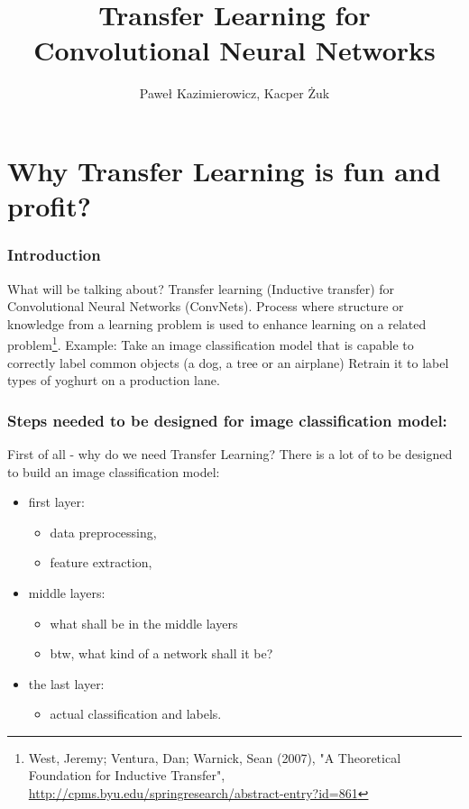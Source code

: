 \documentclass[aspectratio=1610,english]{beamer} %
\title{Transfer Learning for Convolutional Neural Networks}
\author{Paweł Kazimierowicz, Kacper Żuk}
\date{}
\institute[AGH]{

}
\begin{document}
  	\maketitle
	\part{Why Transfer Learning is fun and profit?}
	\section{Introduction}
		\begin{frame}{What will be talking about?}
			Transfer learning (Inductive transfer) for Convolutional Neural Networks (ConvNets). 
			\newline
			\newline
			Process where structure or knowledge from a learning problem is used to enhance learning on a related problem\footnote{West, Jeremy; Ventura, Dan; Warnick, Sean (2007), "A Theoretical Foundation for Inductive Transfer", \url{http://cpms.byu.edu/springresearch/abstract-entry?id=861}}. 
			\newline
			\newline
			Example: \newline
			Take an image classification model that is capable to correctly label common objects (a dog, a tree or an airplane)
			\newline 
			Retrain it to label types of yoghurt on a production lane.
		\end{frame}
	
	\section{Steps needed to be designed for image classification model:}
	\begin{frame}{First of all - why do we need Transfer Learning?}
		There is a lot of to be designed to build an image classification model:
		\begin{itemize}
			\item first layer:
			\begin{itemize}
				\item data preprocessing,
				\item feature extraction,
			\end{itemize}

		\item middle layers:
			\begin{itemize}
				\item what shall be in the middle layers
				\item btw, what kind of a network shall it be?
			\end{itemize}
		
		\item the last layer:
			\begin{itemize}
				\item actual classification and labels.
			\end{itemize}
		\end{itemize}
	 \end{frame}
 
\end{document}
